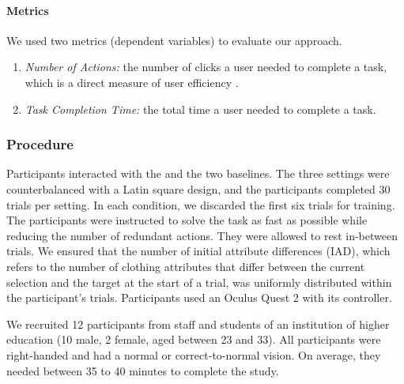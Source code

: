 \paragraph{Metrics}
We used two metrics (dependent variables) to evaluate our approach. 
\begin{enumerate}
    \item \emph{Number of Actions:} the number of clicks a user needed to complete a task, which is a direct measure of user efficiency \cite{card1980klm}. 
    \item \emph{Task Completion Time:} the total time a user needed to complete a task.
\end{enumerate}

\subsubsection{Procedure}
Participants interacted with the \interfaceagent and the two baselines. The three settings were counterbalanced with a Latin square design, and the participants completed 30 trials per setting. In each condition, we discarded the first six trials for training. The participants were instructed to solve the task as fast as possible while reducing the number of redundant actions. They were allowed to rest in-between trials. We ensured that the number of initial attribute differences (IAD), which refers to the number of clothing attributes that differ between the current selection and the target at the start of a trial, was uniformly distributed within the participant's trials. Participants used an Oculus Quest 2 with its controller. 

We recruited 12 participants from staff and students of an institution of higher education (10 male, 2 female, aged between 23 and 33). All participants were right-handed and had a normal or correct-to-normal vision. On average, they needed between 35 to 40 minutes to complete the study.

